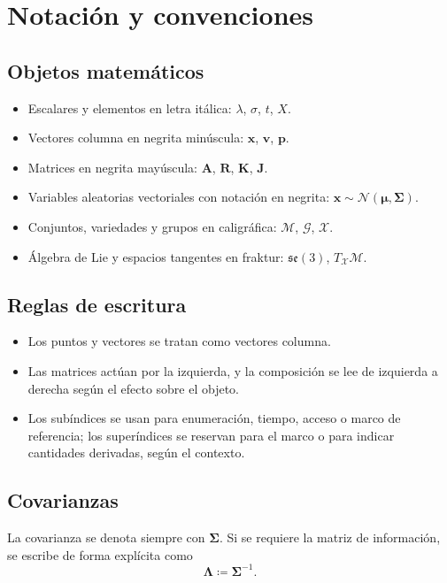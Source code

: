 \section{Notación y convenciones}
\label{sec:notacion}

\subsection{Objetos matemáticos}

\begin{itemize}
	\item Escalares y elementos en letra itálica: $\lambda$, $\sigma$, $t$, $X$.
	\item Vectores columna en negrita minúscula: $\mathbf{x}$, $\mathbf{v}$, $\mathbf{p}$.
	\item Matrices en negrita mayúscula: $\mathbf{A}$, $\mathbf{R}$, $\mathbf{K}$, $\mathbf{J}$.
	\item Variables aleatorias vectoriales con notación en negrita: $\mathbf{x} \sim \mathcal{N}(\boldsymbol{\mu}, \boldsymbol{\Sigma})$.
	\item Conjuntos, variedades y grupos en caligráfica: $\mathcal{M}$, $\mathcal{G}$, $\mathcal{X}$.
	\item Álgebra de Lie y espacios tangentes en fraktur: $\mathfrak{se}(3)$, $T_{\mathcal{X}}\mathcal{M}$.
\end{itemize}

\subsection{Reglas de escritura}

\begin{itemize}
	\item Los puntos y vectores se tratan como vectores columna.
	\item Las matrices actúan por la izquierda, y la composición se lee de izquierda a derecha según el efecto sobre el objeto.
	\item Los subíndices se usan para enumeración, tiempo, acceso o marco de referencia; los superíndices se reservan para el marco o para indicar cantidades derivadas, según el contexto.
\end{itemize}

\subsection{Covarianzas}

La covarianza se denota siempre con $\boldsymbol{\Sigma}$. Si se requiere la matriz de información, se escribe de forma explícita como
\[
\boldsymbol{\Lambda} \coloneq \boldsymbol{\Sigma}^{-1}.
\]

